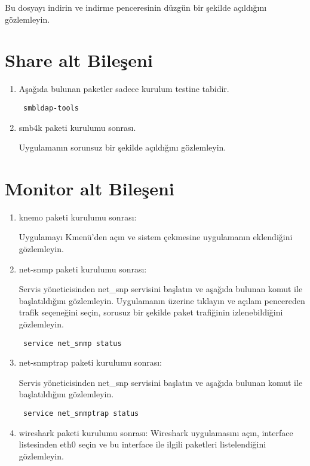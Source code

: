 \documentclass[a4paper,10pt]{article}
\begin{document}
\begin{enumerate}
\begin{itemize}
Bu dosyayı indirin ve indirme penceresinin düzgün bir şekilde açıldığını gözlemleyin.

\end{itemize}

\end{enumerate}

\section{Share alt Bileşeni}
\begin{enumerate}
 \item Aşağıda bulunan paketler sadece kurulum testine tabidir.
\begin{verbatim}
 smbldap-tools
\end{verbatim}

\item smb4k paketi kurulumu sonrası.

Uygulamanın sorunsuz bir şekilde açıldığını gözlemleyin.

\end{enumerate}


\section{Monitor alt Bileşeni}
\begin{enumerate}
\item knemo paketi kurulumu sonrası:

Uygulamayı Kmenü'den açın ve sistem çekmesine uygulamanın  eklendiğini gözlemleyin. 
 \item net-snmp paketi kurulumu sonrası:

Servis yöneticisinden net\_snp servisini başlatın ve aşağıda bulunan komut ile başlatıldığını gözlemleyin. Uygulamanın üzerine tıklayın ve açılam pencereden trafik seçeneğini seçin, sorusuz bir şekilde paket trafiğinin izlenebildiğini gözlemleyin.

\begin{verbatim}
 service net_snmp status
\end{verbatim}

\item net-snmptrap paketi kurulumu sonrası:

Servis yöneticisinden net\_snp servisini başlatın ve aşağıda bulunan komut ile başlatıldığını gözlemleyin.
\begin{verbatim}
 service net_snmptrap status
\end{verbatim}



 \item wireshark paketi kurulumu sonrası:
	Wireshark uygulamasını açın, interface listesinden eth0 seçin ve bu interface ile ilgili paketleri listelendiğini gözlemleyin.
\end{enumerate}
\end{document}
